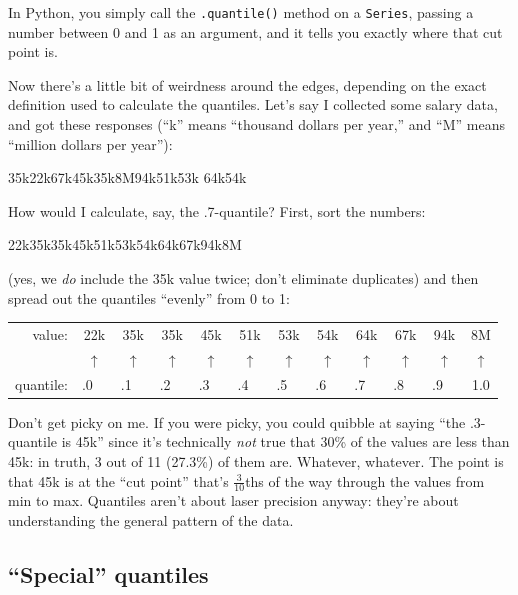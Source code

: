 In Python, you simply call the \texttt{.quantile()} method on a
\texttt{Series}, passing a number between 0 and 1 as an argument, and it tells
you exactly where that cut point is.

Now there's a little bit of weirdness around the edges, depending on the exact
definition used to calculate the quantiles. Let's say I collected some salary
data, and got these responses (``k'' means ``thousand dollars per year,'' and
``M'' means ``million dollars per year''):

\begin{center}
35k\quad 22k\quad 67k\quad 45k\quad 35k\quad 8M\quad 94k\quad 51k\quad 53k\quad
64k\quad 54k
\end{center}

How would I calculate, say, the .7-quantile? First, sort the numbers:

\begin{center}
22k\quad 35k\quad 35k\quad 45k\quad 51k\quad 53k\quad 54k\quad 64k\quad 67k\quad 94k\quad 8M
\end{center}

(yes, we \textit{do} include the 35k value twice; don't eliminate duplicates)
and then spread out the quantiles ``evenly'' from 0 to 1:

\begin{center}
\renewcommand{\arraystretch}{.7}
\begin{tabular}{rccccccccccc}
value: & 22k& 35k& 35k& 45k& 51k& 53k& 54k& 64k& 67k& 94k& 8M\\
& $\uparrow$ &
$\uparrow$ &
$\uparrow$ &
$\uparrow$ &
$\uparrow$ &
$\uparrow$ &
$\uparrow$ &
$\uparrow$ &
$\uparrow$ &
$\uparrow$ &
$\uparrow$ \\
quantile: & .0\ \ & .1\ \  & .2\ \  & .3\ \  & .4\ \  & .5\ \  & .6\ \  & .7\ \  & .8\ \  & .9\ \  & 1.0 \\
\end{tabular}
\end{center}

Don't get picky on me. If you were picky, you could quibble at saying ``the
.3-quantile is 45k'' since it's technically \textit{not} true that 30\% of the
values are less than 45k: in truth, 3 out of 11 (27.3\%) of them are. Whatever,
whatever. The point is that 45k is at the ``cut point'' that's
$\frac{3}{10}$ths of the way through the values from min to max. Quantiles
aren't about laser precision anyway: they're about understanding the general
pattern of the data.

\subsection{``Special'' quantiles}

